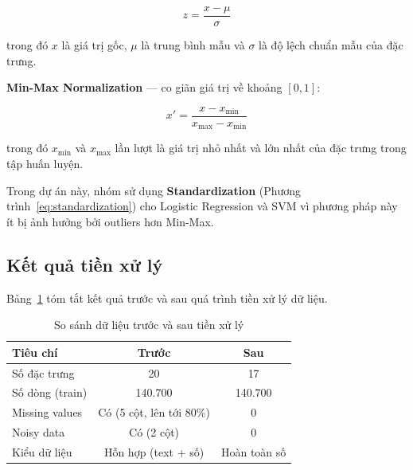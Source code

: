 \begin{equation}
z = \frac{x - \mu}{\sigma}
\label{eq:standardization}
\end{equation}

trong đó $x$ là giá trị gốc, $\mu$ là trung bình mẫu và $\sigma$ là độ lệch chuẩn mẫu của đặc trưng.

\textbf{Min-Max Normalization} --- co giãn giá trị về khoảng $[0, 1]$:

\begin{equation}
x' = \frac{x - x_{\min}}{x_{\max} - x_{\min}}
\label{eq:minmax}
\end{equation}

trong đó $x_{\min}$ và $x_{\max}$ lần lượt là giá trị nhỏ nhất và lớn nhất của đặc trưng trong tập huấn luyện.

Trong dự án này, nhóm sử dụng \textbf{Standardization} (Phương trình~\ref{eq:standardization}) cho Logistic Regression và SVM vì phương pháp này ít bị ảnh hưởng bởi outliers hơn Min-Max.

\subsection{Kết quả tiền xử lý}
\label{subsec:preprocessing_result}

Bảng~\ref{tab:preprocessing_result} tóm tắt kết quả trước và sau quá trình tiền xử lý dữ liệu.

\begin{table}[H]
\centering
\caption{So sánh dữ liệu trước và sau tiền xử lý}
\label{tab:preprocessing_result}
\begin{tabular}{lcc}
\toprule
\textbf{Tiêu chí} & \textbf{Trước} & \textbf{Sau} \\
\midrule
Số đặc trưng & 20 & 17 \\
Số dòng (train) & 140.700 & 140.700 \\
Missing values & Có (5 cột, lên tới 80\%) & 0 \\
Noisy data & Có (2 cột) & 0 \\
Kiểu dữ liệu & Hỗn hợp (text + số) & Hoàn toàn số \\
\bottomrule
\end{tabular}
\end{table}
